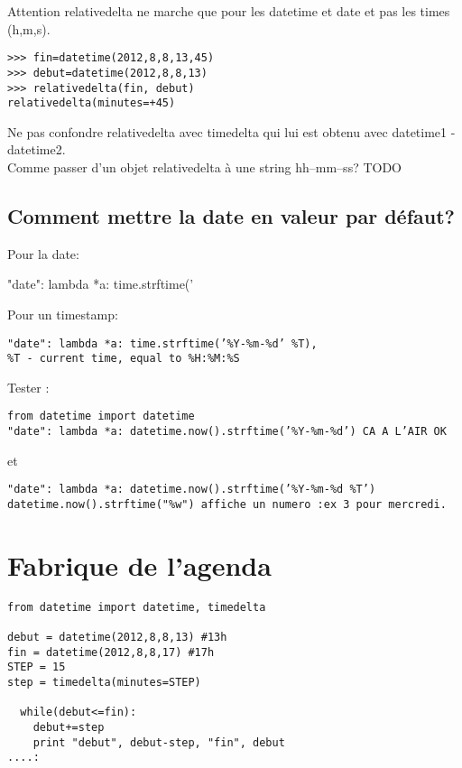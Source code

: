 \documentclass[12pt,a4paper]{article}
\begin{document}
Attention relativedelta ne marche que pour les datetime et date et pas les times (h,m,s).\\

\begin{verbatim}
>>> fin=datetime(2012,8,8,13,45)
>>> debut=datetime(2012,8,8,13)
>>> relativedelta(fin, debut)
relativedelta(minutes=+45)
\end{verbatim}

Ne pas confondre relativedelta avec timedelta qui lui est obtenu avec datetime1 - datetime2.\\

Comme passer d'un objet relativedelta à une string hh--mm--ss? TODO \\




\subsection{Comment mettre la date en valeur par défaut?}
\label{sec:datedefault}

Pour la date:

"date": lambda *a: time.strftime(’%

Pour un timestamp:

\begin{verbatim}
"date": lambda *a: time.strftime(’%Y-%m-%d’ %T),
%T - current time, equal to %H:%M:%S
\end{verbatim}

Tester :

\begin{verbatim}
from datetime import datetime
"date": lambda *a: datetime.now().strftime(’%Y-%m-%d’) CA A L’AIR OK
\end{verbatim}

et

\begin{verbatim}
"date": lambda *a: datetime.now().strftime(’%Y-%m-%d %T’)
datetime.now().strftime("%w") affiche un numero :ex 3 pour mercredi.
\end{verbatim}






\section{Fabrique de l'agenda}
\label{sec:agendafactory}


\begin{verbatim}
from datetime import datetime, timedelta 

debut = datetime(2012,8,8,13) #13h
fin = datetime(2012,8,8,17) #17h 
STEP = 15 
step = timedelta(minutes=STEP)

  while(debut<=fin): 
    debut+=step 
    print "debut", debut-step, "fin", debut 
....:
\end{verbatim}
\end{document}
